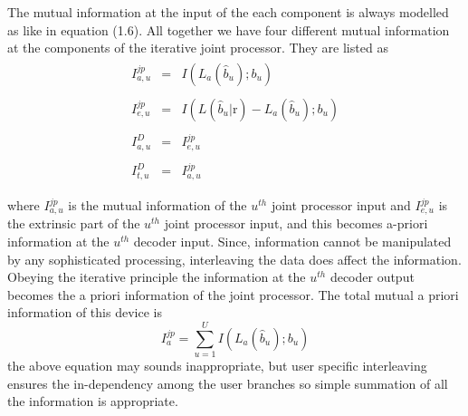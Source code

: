 The mutual information at the input of the each component is always modelled as like in equation (1.6). All together we have four different mutual information at the components of the iterative joint processor. They are listed as
\begin{eqnarray}
\begin{array}{lll}
I_{a,u}^{jp}&=&I(L_a(\hat{b}_u);b_u) \\ \\

I_{e,u}^{jp}&=&I(L(\hat{b}_u\vert \mathrm{r})-L_a(\hat{b}_u);b_u)\\ \\

I_{a,u}^{D}&=&I_{e,u}^{jp} \\ \\

I_{t,u}^{D}&=&I_{a,u}^{jp} \\ \\
\end{array}
\end{eqnarray}
where $I_{a,u}^{jp}$ is the mutual information of the $u^{th}$ joint processor input and $I_{e,u}^{jp}$ is the extrinsic part of the $u^{th}$ joint processor input, and this becomes a-priori information at the $u^{th}$ decoder input. Since, information cannot be manipulated by any sophisticated processing, interleaving the data does affect the information. Obeying the iterative principle the information at the $u^{th}$ decoder output becomes the a priori information of the joint processor. The total mutual a priori information of this device is
\begin{equation}
I_a^{jp}=\sum\limits_{u=1}^{U}I(L_a(\hat{b}_u);b_u)
\end{equation}
the above equation may sounds inappropriate, but user specific interleaving ensures the in-dependency among the user branches so simple summation of all the information is appropriate.

